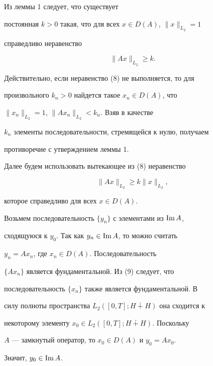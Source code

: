 \begin{pf}


Из леммы 1 следует, что существует


постоянная $k>0$ такая, что для всех $x\in D(A)$, $\|x\|_{L_{2}}=1$


справедливо неравенство


\begin{equation}


\|Ax\|_{L_{2}}\geq k.


\end{equation}


Действительно, если неравенство (8) не выполняется, то для


произвольного $k_{n}>0$ найдется такое $x_{n}\in D(A)$, что


$\|x_{n}\|_{L_{2}}=1$, $\|Ax_{n}\|_{L_{2}}<k_{n}$. Взяв в качестве


$k_{n}$ элементы последовательности, стремящейся к нулю, получаем


противоречие с утверждением леммы 1.


Далее будем использовать вытекающее из (8) неравенство


\begin{equation}


\|Ax\|_{L_{2}}\geq k\|x\|_{L_{2}},


\end{equation}


которое справедливо для всех $x\in D(A)$.


Возьмем последовательность $\{y_{n}\}$ с элементами из $\operatorname{Im} A$,


сходящуюся к $y_{0}$. Так как $y_{n}\in \operatorname{Im} A$, то можно считать


$y_{n}=Ax_{n}$, где $x_{n}\in D(A)$. Последовательность


$\{Ax_{n}\}$ является фундаментальной. Из (9) следует, что


последовательность $\{x_{n}\}$ также является фундаментальной. В


силу полноты пространства $L_{2}([0,T];H\dotplus H)$ она сходится к


некоторому элементу $x_{0}\in L_{2}([0,T];H\dotplus H)$. Поскольку


$A$ --- замкнутый оператор, то $x_{0}\in D(A)$ и $y_{0}=Ax_{0}$.


Значит, $y_{0}\in \operatorname{Im} A$.


\end{pf}





